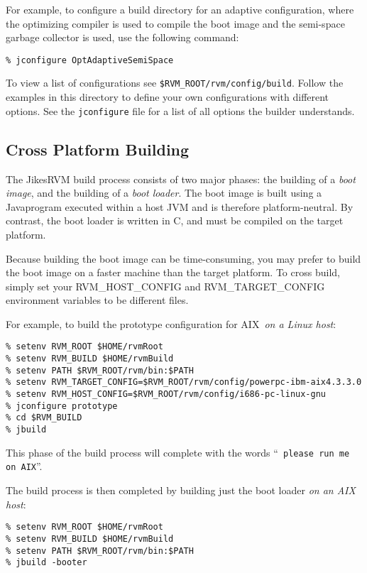 For example, to configure a build directory for an adaptive
configuration, where the optimizing compiler is used to compile the
boot image and the semi-space garbage collector is used, use the
following command:

\begin{verbatim}
% jconfigure OptAdaptiveSemiSpace
\end{verbatim}

To view a list of configurations see 
{\tt \$RVM\_ROOT/rvm/config/build}.  Follow the examples in this
directory to define your own configurations with different options.  See
the {\tt jconfigure} file for a list of all options the builder
understands.

\JikesTMFooter

\subsection{Cross Platform Building}

The Jikes\trademark RVM build process consists of two major phases:
the building of a 
{\em boot image}, and the building of a {\em boot loader}.
The boot image is built using a Java\trademark program executed within a host
JVM and is therefore platform-neutral.  By contrast, the boot loader
is written in C, and must be compiled on the target platform.

Because building the boot image can be time-consuming,
you may prefer to build the boot image
on a faster machine than the target platform.  To cross build, simply
set your 
RVM\_HOST\_CONFIG and RVM\_TARGET\_CONFIG environment variables to
be different files.

For example, to build the prototype configuration for AIX\AIXTMFootnote\
{\em on a Linux host}:
\begin{verbatim}
% setenv RVM_ROOT $HOME/rvmRoot
% setenv RVM_BUILD $HOME/rvmBuild
% setenv PATH $RVM_ROOT/rvm/bin:$PATH
% setenv RVM_TARGET_CONFIG=$RVM_ROOT/rvm/config/powerpc-ibm-aix4.3.3.0
% setenv RVM_HOST_CONFIG=$RVM_ROOT/rvm/config/i686-pc-linux-gnu
% jconfigure prototype
% cd $RVM_BUILD
% jbuild
\end{verbatim}

This phase of the build process will complete with the words ``{\tt
  please run me on AIX}''.


The build process is then completed by building just the boot loader {\em
  on an AIX host}:

\begin{verbatim}
% setenv RVM_ROOT $HOME/rvmRoot
% setenv RVM_BUILD $HOME/rvmBuild
% setenv PATH $RVM_ROOT/rvm/bin:$PATH
% jbuild -booter
\end{verbatim}

